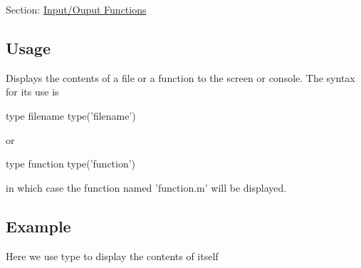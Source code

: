 Section\-: \hyperlink{sec_io}{Input/\-Ouput Functions} \hypertarget{vtkwidgets_vtkxyplotwidget_Usage}{}\subsection{Usage}\label{vtkwidgets_vtkxyplotwidget_Usage}
Displays the contents of a file or a function to the screen or console. The syntax for its use is \begin{DoxyVerb}   type filename
   type('filename')
\end{DoxyVerb}
 or \begin{DoxyVerb}   type function
   type('function')
\end{DoxyVerb}
 in which case the function named {\ttfamily 'function.\-m'} will be displayed. \hypertarget{variables_struct_Example}{}\subsection{Example}\label{variables_struct_Example}
Here we use {\ttfamily type} to display the contents of itself


